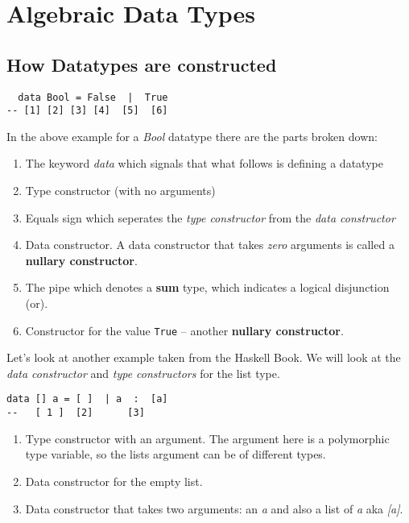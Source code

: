 \section{Algebraic Data Types}

\subsection{How Datatypes are constructed}

\begin{verbatim}
  data Bool = False  |  True
-- [1] [2] [3] [4]  [5]  [6]
\end{verbatim}

In the above example for a \emph{Bool} datatype there are the parts broken down:
\begin{enumerate}
\item The keyword \emph{data} which signals that what follows is defining a datatype
\item Type constructor (with no arguments)
\item Equals sign which seperates the \emph{type constructor} from the \emph{data constructor}
\item Data constructor. A data constructor that takes \emph{zero} arguments is called a \textbf{nullary constructor}.
\item The pipe which denotes a \textbf{sum} type, which indicates a logical disjunction (or).
\item Constructor for the value \texttt{True} -- another \textbf{nullary constructor}.
\end{enumerate}

Let's look at another example taken from the Haskell Book.
We will look at the \emph{data constructor} and \emph{type constructors} for the list type.

\begin{verbatim}
data [] a = [ ]  | a  :  [a]
--   [ 1 ]  [2]      [3]
\end{verbatim}

\begin{enumerate}
\item Type constructor with an argument. The argument here is a polymorphic type variable,
  so the lists argument can be of different types.
\item Data constructor for the empty list.
\item Data constructor that takes two arguments: an \emph{a} and also a list of \emph{a} aka \emph{[a]}.
\end{enumerate}

